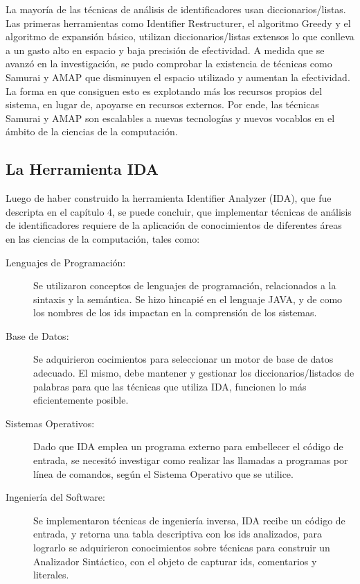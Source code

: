 La mayoría de las técnicas de análisis de identificadores usan diccionarios/listas. Las primeras herramientas como Identifier Restructurer, el algoritmo Greedy y el algoritmo de expansión básico, utilizan diccionarios/listas extensos lo que conlleva a un gasto alto en espacio y baja precisión de efectividad. A medida que se avanzó en la investigación, se pudo comprobar la existencia de técnicas como Samurai y AMAP que disminuyen el espacio utilizado y aumentan la efectividad. La forma en que consiguen esto es explotando más los recursos propios del sistema, en lugar de, apoyarse en recursos externos. Por ende, las técnicas Samurai y AMAP son escalables a nuevas tecnologías y nuevos vocablos en el ámbito de la ciencias de la computación.

\subsection{La Herramienta IDA}

Luego de haber construido la herramienta Identifier Analyzer (IDA), que fue descripta en el capítulo 4, se puede concluir, que implementar técnicas de análisis de identificadores requiere de la aplicación de conocimientos de diferentes áreas en las ciencias de la computación, tales como:

\begin{description}

\item[Lenguajes de Programación:] Se utilizaron conceptos de lenguajes de programación, relacionados a la sintaxis y la semántica. Se hizo hincapié en el lenguaje JAVA, y de como los nombres de los ids impactan en la comprensión de los sistemas.

\item[Base de Datos:] Se adquirieron cocimientos para seleccionar un motor de base de datos adecuado. El mismo, debe mantener y gestionar los diccionarios/listados de palabras para que las técnicas que utiliza IDA, funcionen lo más eficientemente posible.

\item[Sistemas Operativos:] Dado que IDA emplea un programa externo para embellecer el código de entrada, se necesitó investigar como realizar las llamadas a programas por línea de comandos, según el Sistema Operativo que se utilice.


\item[Ingeniería del Software:] Se implementaron técnicas de ingeniería inversa, IDA recibe un código de entrada, y retorna una tabla descriptiva con los ids analizados, para lograrlo se adquirieron conocimientos sobre técnicas para construir un Analizador Sintáctico, con el objeto de capturar ids, comentarios y literales.

\end{description}

